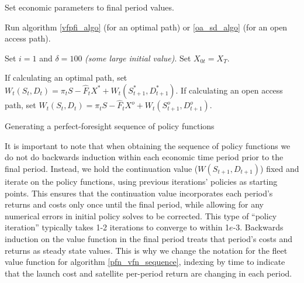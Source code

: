 \documentclass[12pt]{article}
\begin{document}
\begin{algorithm}
	Set economic parameters to final period values.
	
	Run algorithm \ref{vfpfi_algo} (for an optimal path) or \ref{oa_sd_algo} (for an open access path).
	
	 {
		Set $i=1$ and $\delta = 100$ \textit{(some large initial value)}. Set $X_{0t} = X_T$.
		
		If calculating an optimal path, set $W_t(S_t,D_t) = \pi_t S - \hat{F}_t X^* + W_t(S^*_{t+1},D^*_{t+1})$. If calculating an open access path, set $W_t(S_t,D_t) = \pi_t S - \hat{F}_t X^o + W_t(S^o_{t+1},D^o_{t+1})$.
	}
	\caption{Generating a perfect-foresight sequence of policy functions}\label{pfn_vfn_sequence}
\end{algorithm}

It is important to note that when obtaining the sequence of policy functions we do not do backwards induction within each economic time period prior to the final period. Instead, we hold the continuation value ($W(S_{t+1},D_{t+1})$) fixed and iterate on the policy functions, using previous iterations' policies as starting points. This ensures that the continuation value incorporates each period's returns and costs only once until the final period, while allowing for any numerical errors in initial policy solves to be corrected. This type of ``policy iteration'' typically takes 1-2 iterations to converge to within 1$e$-3. Backwards induction on the value function in the final period treats that period's costs and returns as steady state values. This is why we change the notation for the fleet value function for algorithm \ref{pfn_vfn_sequence}, indexing by time to indicate that the launch cost and satellite per-period return are changing in each period. \\
\end{document}
